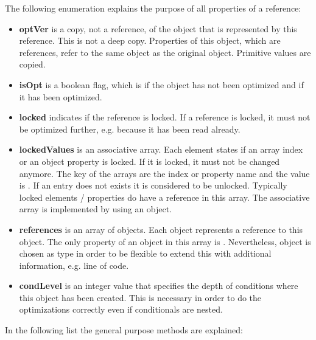 The following enumeration explains the purpose of all properties of a reference:

\begin{itemize}
\item{\textbf{optVer}} is a copy, not a reference, of the object that is represented by this reference. This is not a deep copy. Properties of this object, which are references, refer to the same object as the original object. Primitive values are copied.

\item{\textbf{isOpt}} is a boolean flag, which is  if the object has not been optimized and  if it has been optimized.

\item{\textbf{locked}} indicates if the reference is locked. If a reference is locked, it must not be optimized further, e.g. because it has been read already. 

\item{\textbf{lockedValues}} is an associative array. Each element states if an array index or an object property is locked. If it is locked, it must not be changed anymore. The key of the arrays are the index or property name and the value is . If an entry does not exists it is considered to be unlocked. Typically locked elements / properties do have a reference in this array. The associative array is implemented by using an object.

\item{\textbf{references}} is an array of objects. Each object represents a reference to this object. The only property of an object in this array is . Nevertheless, object is chosen as type in order to be flexible to extend this with additional information, e.g. line of code.

\item{\textbf{condLevel}} is an integer value that specifies the depth of conditions where this object has been created. This is necessary in order to do the optimizations correctly even if conditionals are nested.
\end{itemize}

In the following list the general purpose methods are explained:


